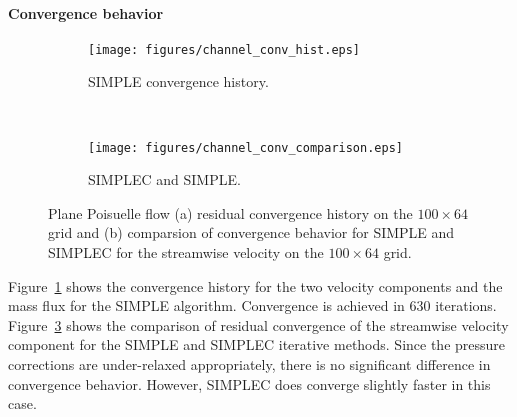 \paragraph{Convergence behavior}
\begin{figure}[h]
    \centering
    \captionsetup{justification=centering}
    \begin{subfigure}[b]{0.47\textwidth}
    \captionsetup{justification=centering}
        \texttt{[image: figures/channel\_conv\_hist.eps]}
        \caption{SIMPLE convergence history.}
        \label{fig:channelhist}
    \end{subfigure}
    ~ %
    \begin{subfigure}[b]{0.47\textwidth}
    \centering
    \captionsetup{justification=centering}
        \texttt{[image: figures/channel\_conv\_comparison.eps]}
        \caption{SIMPLEC and SIMPLE.}
        \label{fig:channelcmp}
    \end{subfigure}
    \caption{Plane Poisuelle flow  (a) residual convergence history on the $100\times64$ grid and (b) comparsion of convergence behavior for SIMPLE and SIMPLEC for the streamwise velocity on the $100\times64$ grid.}
\end{figure}
Figure~\ref{fig:channelhist} shows the convergence history for the two velocity components and the mass flux for the SIMPLE algorithm. Convergence is achieved in $630$ iterations. Figure~\ref{fig:channelcmp} shows the comparison of residual convergence of the streamwise velocity component for the SIMPLE and SIMPLEC iterative methods. Since the pressure corrections are under-relaxed appropriately, there is no significant difference in convergence behavior. However, SIMPLEC does converge slightly faster in this case.

